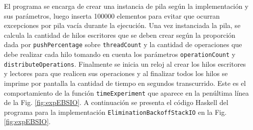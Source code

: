El programa se encarga de crear una instancia de pila según la implementación y sus parámetros, luego inserta 100000 elementos para evitar que ocurran excepciones por pila vacía durante la ejecución.
Una vez instanciada la pila, se calcula la cantidad de hilos escritores que se deben crear según la proporción dada por \texttt{pushPercentage} sobre \texttt{threadCount} y la cantidad de operaciones que debe realizar cada hilo tomando en cuenta los parámetros \texttt{operationCount} y \texttt{distributeOperations}.
Finalmente se inicia un reloj al crear los hilos escritores y lectores para que realicen sus operaciones y al finalizar todos los hilos se imprime por pantalla la cantidad de tiempo en segundos transcurrido. Este es el comportamiento de la función \texttt{timeExperiment} que aparece en la penúltima línea de la Fig. \ref{fig:expEBSIO}.
A continuación se presenta el código Haskell del programa para la implementación \texttt{EliminationBackoffStackIO} en la Fig. \ref{fig:expEBSIO}.

